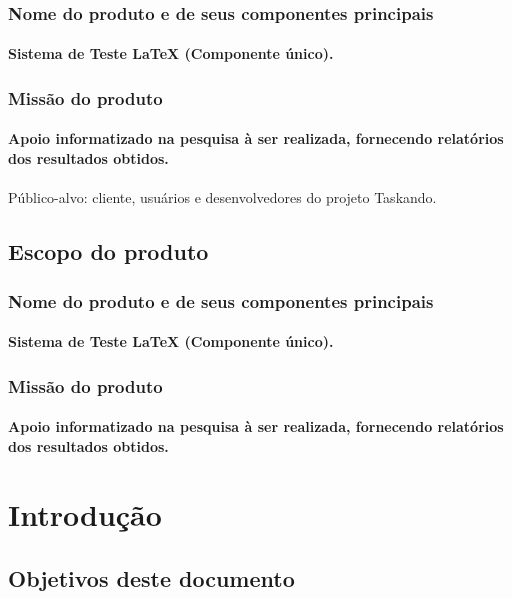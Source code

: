 \documentclass{article}
\begin{document}
		\subsubsection{Nome do produto e de seus componentes principais}
			\paragraph{Sistema de Teste LaTeX (Componente único). }
		\subsubsection{Missão do produto}
			\paragraph{Apoio informatizado na pesquisa à ser realizada, fornecendo relatórios dos resultados obtidos.}
			\paragraph{}Público-alvo: cliente, usuários e desenvolvedores do projeto Taskando.
	\subsection{Escopo do produto}
		\subsubsection{Nome do produto e de seus componentes principais}
			\paragraph{Sistema de Teste LaTeX (Componente único). }
		\subsubsection{Missão do produto}
			\paragraph{Apoio informatizado na pesquisa à ser realizada, fornecendo relatórios dos resultados obtidos.}
			
\newpage

\section{Introdução}
	\subsection{Objetivos deste documento}
\end{document}
